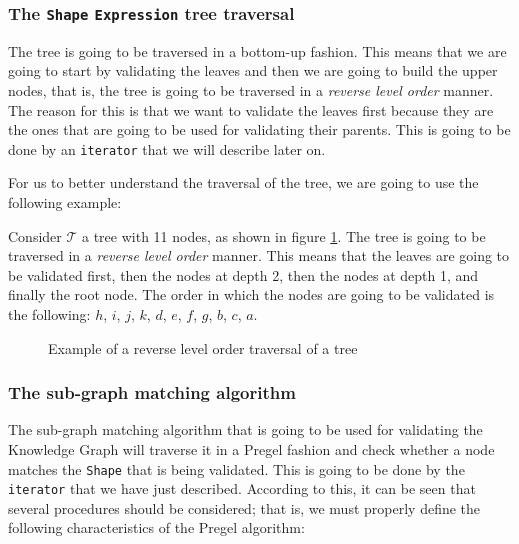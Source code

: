 \label{section:shape_expression_tree_traversal}
\subsubsection{The \texttt{Shape} \texttt{Expression} tree traversal}

The tree is going to be traversed in a bottom-up fashion. This means that we are going to start by validating the leaves and then we are going to build the upper nodes, that is, the tree is going to be traversed in a \textit{reverse level order} manner. The reason for this is that we want to validate the leaves first because they are the ones that are going to be used for validating their parents. This is going to be done by an \texttt{iterator} that we will describe later on.

For us to better understand the traversal of the tree, we are going to use the following example:

\begin{example}
    Consider $\mathcal{T}$ a tree with 11 nodes, as shown in figure \ref{fig:tree_traversal}. The tree is going to be traversed in a \textit{reverse level order} manner. This means that the leaves are going to be validated first, then the nodes at depth 2, then the nodes at depth 1, and finally the root node. The order in which the nodes are going to be validated is the following: $h$, $i$, $j$, $k$, $d$, $e$, $f$, $g$, $b$, $c$, $a$.
    \begin{figure}[ht]
        \centering
        
        \caption{Example of a reverse level order traversal of a tree}
        \label{fig:tree_traversal}
    \end{figure}
\end{example}

\subsubsection{The sub-graph matching algorithm}

The sub-graph matching algorithm that is going to be used for validating the Knowledge Graph will traverse it in a Pregel fashion and check whether a node matches the \texttt{Shape} that is being validated. This is going to be done by the \texttt{iterator} that we have just described. According to this, it can be seen that several procedures should be considered; that is, we must properly define the following characteristics of the Pregel algorithm:

